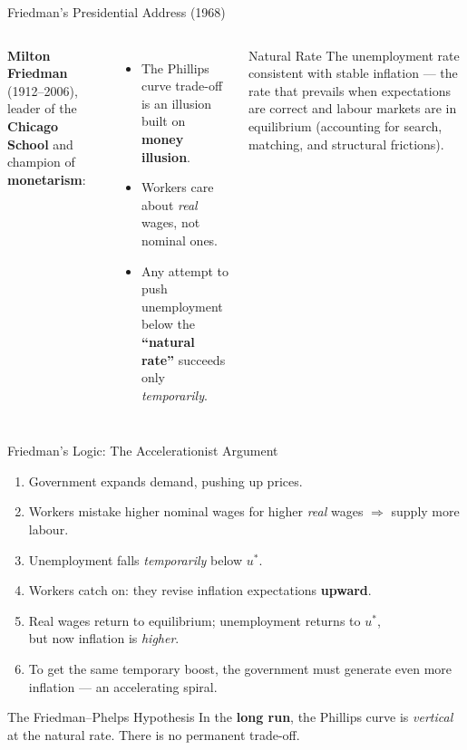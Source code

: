 \documentclass[aspectratio=169, 10pt]{beamer}
\begin{document}
\begin{frame}{Friedman's Presidential Address (1968)}
\begin{columns}[T]
\textbf{Milton Friedman} (1912--2006), leader of the \textbf{Chicago School}
and champion of \textbf{monetarism}:
\vspace{0.5em}
\begin{itemize}
  \item The Phillips curve trade-off is an \alert{illusion} built on
        \textbf{money illusion}.
  \item Workers care about \textit{real} wages, not nominal ones.
  \item Any attempt to push unemployment below the \textbf{``natural rate''}
        succeeds only \textit{temporarily}.
\end{itemize}
\begin{block}{Natural Rate}
The unemployment rate consistent with stable inflation ---
the rate that prevails when expectations are correct and
labour markets are in equilibrium (accounting for search,
matching, and structural frictions).
\end{block}
\end{columns}
\end{frame}

\begin{frame}{Friedman's Logic: The Accelerationist Argument}
\begin{enumerate}
  \item Government expands demand, pushing up prices.
  \item Workers mistake higher nominal wages for higher \textit{real} wages
        $\Rightarrow$ supply more labour.
  \item Unemployment falls \textit{temporarily} below $u^*$.
  \item Workers catch on: they revise inflation expectations \textbf{upward}.
  \item Real wages return to equilibrium; unemployment returns to $u^*$,\\
        but now inflation is \textit{higher}.
  \item To get the same temporary boost, the government must generate
        \alert{even more} inflation --- an accelerating spiral.
\end{enumerate}
\vspace{0.5em}
\begin{alertblock}{The Friedman--Phelps Hypothesis}
In the \textbf{long run}, the Phillips curve is \textit{vertical}
at the natural rate. There is no permanent trade-off.
\end{alertblock}
\end{frame}
\end{document}
